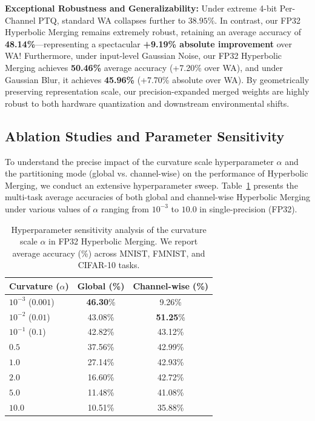 \documentclass{article}
\theoremstyle{plain}
\theoremstyle{definition}
\theoremstyle{remark}
\begin{document}
\textbf{Exceptional Robustness and Generalizability:} Under extreme 4-bit Per-Channel PTQ, standard WA collapses further to $38.95\%$. In contrast, our FP32 Hyperbolic Merging remains extremely robust, retaining an average accuracy of \textbf{48.14\%}---representing a spectacular \textbf{+9.19\% absolute improvement} over WA! Furthermore, under input-level Gaussian Noise, our FP32 Hyperbolic Merging achieves \textbf{50.46\%} average accuracy (+7.20\% over WA), and under Gaussian Blur, it achieves \textbf{45.96\%} (+7.70\% absolute over WA). By geometrically preserving representation scale, our precision-expanded merged weights are highly robust to both hardware quantization and downstream environmental shifts.

\subsection{Ablation Studies and Parameter Sensitivity}
To understand the precise impact of the curvature scale hyperparameter $\alpha$ and the partitioning mode (global vs. channel-wise) on the performance of Hyperbolic Merging, we conduct an extensive hyperparameter sweep. Table~\ref{tab:ablation} presents the multi-task average accuracies of both global and channel-wise Hyperbolic Merging under various values of $\alpha$ ranging from $10^{-3}$ to $10.0$ in single-precision (FP32).

\begin{table}[h]
\caption{Hyperparameter sensitivity analysis of the curvature scale $\alpha$ in FP32 Hyperbolic Merging. We report average accuracy (\%) across MNIST, FMNIST, and CIFAR-10 tasks.}
\label{tab:ablation}
\vskip 0.15in
\begin{center}
\begin{small}
\setlength{\tabcolsep}{5pt}
\begin{tabular}{lcc}
\toprule
Curvature ($\alpha$) & Global (\%) & Channel-wise (\%) \\
\midrule
$10^{-3}$ ($0.001$) & \textbf{46.30}\% & 9.26\% \\
$10^{-2}$ ($0.01$) & 43.08\% & \textbf{51.25}\% \\
$10^{-1}$ ($0.1$) & 42.82\% & 43.12\% \\
$0.5$ & 37.56\% & 42.99\% \\
$1.0$ & 27.14\% & 42.93\% \\
$2.0$ & 16.60\% & 42.72\% \\
$5.0$ & 11.48\% & 41.08\% \\
$10.0$ & 10.51\% & 35.88\% \\
\bottomrule
\end{tabular}
\end{small}
\end{center}
\vskip -0.1in
\end{table}
\end{document}
